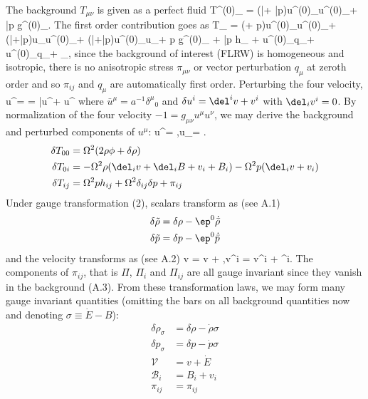 \documentclass[10pt,letterpaper]{article}
\begin{document}
The background $T_{\mu\nu}$ is given as a perfect fluid
\be
	T^{(0)}_{\mu\nu} = (\bar\rho + \bar p)u^{(0)}_\mu u^{(0)}_\nu + \bar p g^{(0)}_{\mu\nu}.
\ee
The first order contribution goes as
\be
	\delta T_{\mu\nu} = (\delta\rho + \delta p)u^{(0)}_{\mu}u^{(0)}_\nu + (\bar\rho+\bar p)\delta u_\mu u^{(0)}_\nu + (\bar\rho+\bar p)u^{(0)}_\mu \delta u_\nu + \delta p g^{(0)}_{\mu\nu} + \bar p h_{\mu\nu} + u^{(0)}_\mu q_\nu + u^{(0)}_\nu q_\mu + \pi_{\mu\nu},
\ee
since the background of interest (FLRW) is homogeneous and isotropic, there is no anisotropic stress $\pi_{\mu\nu}$ or vector perturbation $q_\mu$ at zeroth order and so $\pi_{ij}$ and $q_\mu$ are automatically first order.
Perturbing the four velocity,
\be
	u^\mu = = \bar u^\mu + \delta u^\mu
\ee
where $\bar u^\mu = a^{-1} \delta^\mu{}_0$ and $\delta u^i = \del^i v + v^i$ with $\del_i v^i = 0$. By normalization of the four velocity $-1 = g_{\mu\nu}u^\mu u^\nu$, we may derive the background and perturbed components of $u^\mu$:
\be
	u^\mu = ,\qquad u_\mu = \Omega{}.
\ee
\begin{align}
	\delta T_{00} &= \Omega^2(2\rho \phi + \delta \rho)\\
	\delta T_{0i} &= -\Omega^2\rho(\del_i v + \del_i B + v_i + B_i)-\Omega^2 p(\del_i v + v_i)\\
	\delta T_{ij} &= \Omega^2ph_{ij} + \Omega^2 \delta_{ij} \delta p + \pi_{ij}
\end{align}
Under gauge transformation (2), scalars transform as (see A.1)
\begin{align}
	\delta \tilde \rho &= \delta \rho - \ep^0 \dot{\bar\rho}\\
\delta \tilde p &= \delta p - \ep^0 \dot{\bar p}
\end{align}
and the velocity transforms as (see A.2)
\be
	\tilde v = v + \dot \ep,\quad \tilde v^i = v^i + \dot \ep^i.
\ee
The components of $\pi_{ij}$, that is $\Pi$, $\Pi_i$ and $\Pi_{ij}$ are all gauge invariant since they vanish in the background (A.3). From these transformation laws, we may form many gauge invariant quantities (omitting the bars on all background quantities now and denoting $\sigma \equiv \dot E-B$):
\begin{align}
	\delta \rho_\sigma &= \delta \rho - \dot\rho\sigma \\
	\delta p_\sigma &= \delta p - \dot p\sigma\\
	\mathcal V &= v+\dot E\\
	\mathcal B_i &= B_i + v_i\\
	\pi_{ij} &= \pi_{ij}
\end{align}
\end{document}

